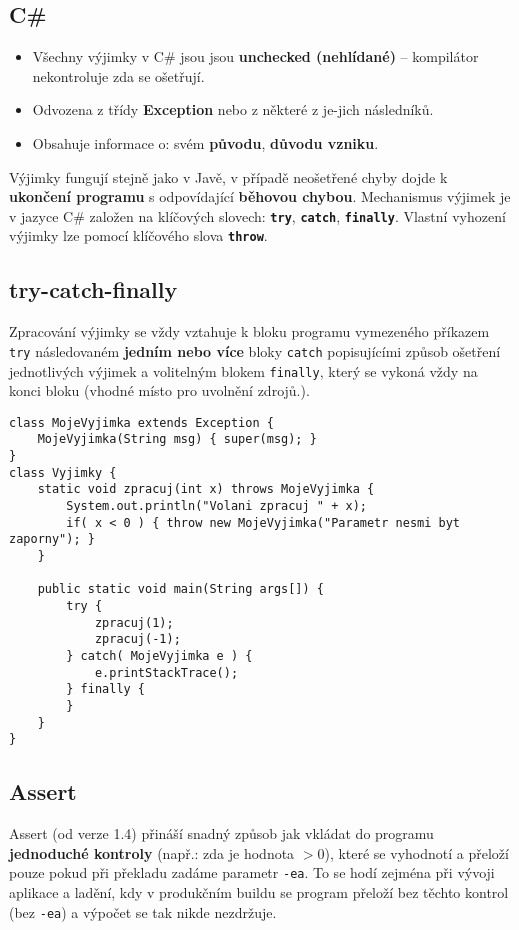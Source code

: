 \subsection{C\#}
\begin{itemize}
\item Všechny výjimky v C\# jsou jsou \textbf{unchecked (nehlídané)} -- kompilátor nekontroluje zda se ošetřují.
\item Odvozena z třídy \textbf{Exception} nebo z některé z je-jich následníků.
\item Obsahuje informace o: svém \textbf{původu}, \textbf{důvodu vzniku}.
\end{itemize}
Výjimky fungují stejně jako v Javě, v případě neošetřené chyby dojde k \textbf{ukončení programu} s odpovídající \textbf{běhovou chybou}. Mechanismus výjimek je v jazyce C\# založen na klíčových slovech: \texttt{\textbf{try}}, \texttt{\textbf{catch}}, \texttt{\textbf{finally}}. Vlastní vyhození výjimky lze pomocí klíčového slova \textbf{\texttt{throw}}.

\subsection{try-catch-finally}
Zpracování výjimky se vždy vztahuje k bloku programu vymezeného příkazem \texttt{try} následovaném \textbf{jedním nebo více} bloky \texttt{catch} popisujícími způsob ošetření jednotlivých výjimek a volitelným blokem \texttt{finally}, který se vykoná vždy na konci bloku (vhodné místo pro uvolnění zdrojů.).

\begin{verbatim}
class MojeVyjimka extends Exception { 
	MojeVyjimka(String msg) { super(msg); } 
}
class Vyjimky {
	static void zpracuj(int x) throws MojeVyjimka { 
		System.out.println("Volani zpracuj " + x); 
		if( x < 0 ) { throw new MojeVyjimka("Parametr nesmi byt zaporny"); }
	} 
	
	public static void main(String args[]) { 
		try { 
			zpracuj(1); 
			zpracuj(-1); 
		} catch( MojeVyjimka e ) {  
			e.printStackTrace();  
		} finally {
		}
	} 
}
\end{verbatim}

\subsection{Assert}
Assert (od verze 1.4) přináší snadný způsob jak vkládat do programu \textbf{jednoduché kontroly} (např.: zda je hodnota $> 0$), které se vyhodnotí a přeloží pouze pokud při překladu zadáme parametr \texttt{-ea}. To se hodí zejména při vývoji aplikace a ladění, kdy v produkčním buildu se program přeloží bez těchto kontrol (bez \texttt{-ea}) a výpočet se tak nikde nezdržuje.

